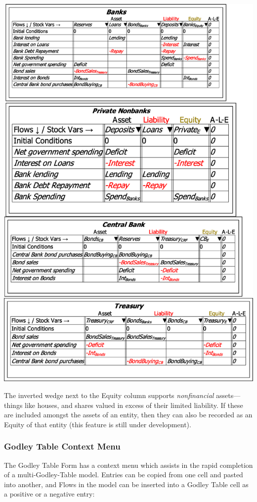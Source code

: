 \noindent\includegraphics[width=\textwidth]{images/GodleyTableImagesMultiTablesFinished}

The inverted wedge next to the Equity column supports \emph{nonfinancial
}assets---things like houses, and shares valued in excess of their
limited liability. If these are included amongst the assets of an
entity, then they can also be recorded as an Equity of that entity
(this feature is still under development).

\subsubsection{Godley Table Context Menu}

The Godley Table Form has a context menu which assists in the rapid
completion of a multi-Godley-Table model. Entries can be copied from
one cell and pasted into another, and Flows in the model can be inserted
into a Godley Table cell as a positive or a negative entry:

